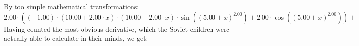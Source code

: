 \documentclass{article}
\begin{document}
\newline
By too simple mathematical transformations:
 ${{{2.00} \cdot \left({{\left({-1.00}\right) \cdot {\left({{10.00} + {{2.00} \cdot {x}}}\right) \cdot {\left({{10.00} + {{2.00} \cdot {x}}}\right) \cdot  \sin {\left({\left({{5.00} + {x}}\right) ^ {2.00}}\right)} }}} + {{2.00} \cdot  \cos {\left({\left({{5.00} + {x}}\right) ^ {2.00}}\right)} }}\right)} + {\left({{10.00} + {{2.00} \cdot {x}}}\right) \cdot \left({{{\left({-2.00}\right) \cdot {\left({{10.00} + {{2.00} \cdot {x}}}\right) \cdot  \sin {\left({\left({{5.00} + {x}}\right) ^ {2.00}}\right)} }} - {\left({{10.00} + {{2.00} \cdot {x}}}\right) \cdot \left({{{2.00} \cdot  \sin {\left({\left({{5.00} + {x}}\right) ^ {2.00}}\right)} } + {\left({{10.00} + {{2.00} \cdot {x}}}\right) \cdot { \cos {\left({\left({{5.00} + {x}}\right) ^ {2.00}}\right)}  \cdot \left({{10.00} + {{2.00} \cdot {x}}}\right)}}}\right)}} - {{2.00} \cdot {\left({{10.00} + {{2.00} \cdot {x}}}\right) \cdot  \sin {\left({\left({{5.00} + {x}}\right) ^ {2.00}}\right)} }}}\right)}} = {{{\left({-2.00}\right) \cdot {\left({{10.00} + {{2.00} \cdot {x}}}\right) \cdot {\left({{10.00} + {{2.00} \cdot {x}}}\right) \cdot  \sin {\left({\left({{5.00} + {x}}\right) ^ {2.00}}\right)} }}} + {{4.00} \cdot  \cos {\left({\left({{5.00} + {x}}\right) ^ {2.00}}\right)} }} + {\left({{10.00} + {{2.00} \cdot {x}}}\right) \cdot \left({{{\left({-2.00}\right) \cdot {\left({{10.00} + {{2.00} \cdot {x}}}\right) \cdot  \sin {\left({\left({{5.00} + {x}}\right) ^ {2.00}}\right)} }} - {\left({{10.00} + {{2.00} \cdot {x}}}\right) \cdot \left({{{2.00} \cdot  \sin {\left({\left({{5.00} + {x}}\right) ^ {2.00}}\right)} } + {\left({{10.00} + {{2.00} \cdot {x}}}\right) \cdot { \cos {\left({\left({{5.00} + {x}}\right) ^ {2.00}}\right)}  \cdot \left({{10.00} + {{2.00} \cdot {x}}}\right)}}}\right)}} - {{2.00} \cdot {\left({{10.00} + {{2.00} \cdot {x}}}\right) \cdot  \sin {\left({\left({{5.00} + {x}}\right) ^ {2.00}}\right)} }}}\right)}}$ 
 \newline
 \newline 
Having counted the most obvious derivative, which the Soviet children were actually able to calculate in their minds, we get:
\end{document}
